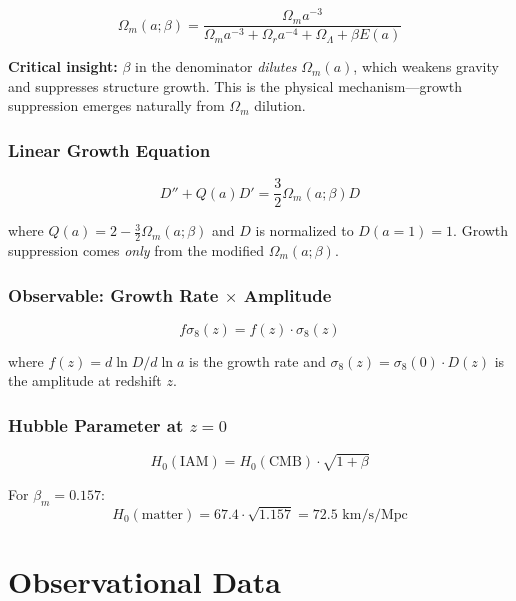 \documentclass[11pt,letterpaper]{article}
\begin{document}
\begin{equation}
\Omega_m(a; \beta) = \frac{\Omega_m a^{-3}}{\Omega_m a^{-3} + \Omega_r a^{-4} + \Omega_\Lambda + \beta E(a)}
\end{equation}

\noindent\textbf{Critical insight:} $\beta$ in the denominator \textit{dilutes} $\Omega_m(a)$, which weakens gravity and suppresses structure growth. This is the physical mechanism---growth suppression emerges naturally from $\Omega_m$ dilution.

\subsubsection{Linear Growth Equation}

\begin{equation}
D'' + Q(a) D' = \frac{3}{2} \Omega_m(a; \beta) D
\end{equation}

where $Q(a) = 2 - \frac{3}{2}\Omega_m(a; \beta)$ and $D$ is normalized to $D(a=1) = 1$. Growth suppression comes \textit{only} from the modified $\Omega_m(a; \beta)$.

\subsubsection{Observable: Growth Rate $\times$ Amplitude}

\begin{equation}
f\sigma_8(z) = f(z) \cdot \sigma_8(z)
\end{equation}

where $f(z) = d \ln D / d \ln a$ is the growth rate and $\sigma_8(z) = \sigma_8(0) \cdot D(z)$ is the amplitude at redshift $z$.

\subsubsection{Hubble Parameter at $z=0$}

\begin{equation}
H_0(\text{IAM}) = H_0(\text{CMB}) \cdot \sqrt{1 + \beta}
\end{equation}

For $\beta_m = 0.157$:
\begin{equation}
H_0(\text{matter}) = 67.4 \cdot \sqrt{1.157} = 72.5 \text{ km/s/Mpc}
\end{equation}

\section{Observational Data}
\end{document}
